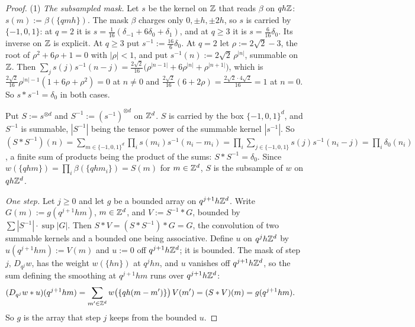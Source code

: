 \begin{proof}
\leanok
{}
(1) \emph{The subsampled mask.} Let $s$ be the kernel on $\mathbb{Z}$ that reads $\beta$ on $qh\mathbb{Z}$:
$s(m) := \beta(\{qmh\})$. The mask $\beta$ charges only $0, \pm h, \pm 2h$, so $s$ is carried by
$\{-1, 0, 1\}$: at $q = 2$ it is $s = \tfrac{1}{16}(\delta_{-1} + 6\delta_0 + \delta_1)$, and at
$q \ge 3$ it is $s = \tfrac{6}{16}\delta_0$. Its inverse on $\mathbb{Z}$ is explicit. At $q \ge 3$ put
$s^{-1} := \tfrac{16}{6}\delta_0$. At $q = 2$ let $\rho := 2\sqrt2 - 3$, the root of
$\rho^2 + 6\rho + 1 = 0$ with $|\rho| < 1$, and put $s^{-1}(n) := 2\sqrt2\,\rho^{|n|}$, summable on
$\mathbb{Z}$. Then $\sum_j s(j)s^{-1}(n - j) = \tfrac{2\sqrt2}{16}\bigl(\rho^{|n-1|} + 6\rho^{|n|} +
\rho^{|n+1|}\bigr)$, which is $\tfrac{2\sqrt2}{16}\rho^{|n|-1}(1 + 6\rho + \rho^2) = 0$ at $n \ne 0$
and $\tfrac{2\sqrt2}{16}(6 + 2\rho) = \tfrac{2\sqrt2 \cdot 4\sqrt2}{16} = 1$ at $n = 0$. So
$s * s^{-1} = \delta_0$ in both cases.

Put $S := s^{\otimes d}$ and $S^{-1} := (s^{-1})^{\otimes d}$ on $\mathbb{Z}^d$. $S$ is carried by the box
$\{-1, 0, 1\}^d$, and $S^{-1}$ is summable, $|S^{-1}|$ being the tensor power of the summable
kernel $|s^{-1}|$. So $(S * S^{-1})(n) = \sum_{m \in \{-1,0,1\}^d}\prod_i s(m_i)s^{-1}(n_i - m_i) =
\prod_i\sum_{j \in \{-1,0,1\}}s(j)s^{-1}(n_i - j) = \prod_i\delta_0(n_i)$, a finite sum of products
being the product of the sums: $S * S^{-1} = \delta_0$. Since $w(\{qhm\}) = \prod_i\beta(\{qhm_i\})
= S(m)$ for $m \in \mathbb{Z}^d$, $S$ is the subsample of $w$ on $qh\mathbb{Z}^d$.

\emph{One step.} Let $j \ge 0$ and let $g$ be a bounded array on $q^{j+1}h\mathbb{Z}^d$. Write
$G(m) := g(q^{j+1}hm)$, $m \in \mathbb{Z}^d$, and $V := S^{-1} * G$, bounded by
$\sum|S^{-1}|\cdot\sup|G|$. Then $S * V = (S * S^{-1}) * G = G$, the convolution of two summable
kernels and a bounded one being associative. Define $u$ on $q^jh\mathbb{Z}^d$ by $u(q^{j+1}hm) := V(m)$ and
$u := 0$ off $q^{j+1}h\mathbb{Z}^d$; it is bounded. The mask of step $j$, $D_{q^j}w$, has the weight
$w(\{hn\})$ at $q^jhn$, and $u$ vanishes off $q^{j+1}h\mathbb{Z}^d$, so the sum defining the smoothing at
$q^{j+1}hm$ runs over $q^{j+1}h\mathbb{Z}^d$:
\begin{align*}
(D_{q^j}w * u)(q^{j+1}hm) &= \sum_{m' \in \mathbb{Z}^d}w\bigl(\{qh(m - m')\}\bigr)\,V(m') = (S * V)(m)
= g(q^{j+1}hm).
\end{align*}
So $g$ is the array that step $j$ keeps from the bounded $u$.


\end{proof}
